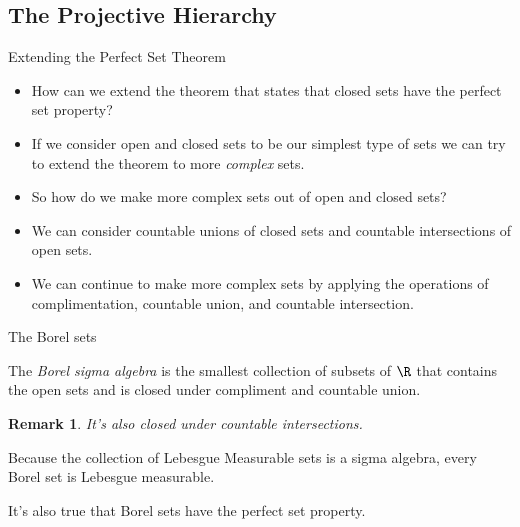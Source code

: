 \documentclass{beamer}
\newtheorem{remark}[theorem]{Remark}
\begin{document}
\subsection{The Projective Hierarchy}

\begin{frame}{Extending the Perfect Set Theorem}

\begin{itemize}
\item How can we extend the theorem that states that closed sets have the
perfect set property?
\item If we consider open and closed sets to be our simplest type of
sets we can try to extend the theorem to more \emph{complex} sets.
\item So how do we make more complex sets out of open and closed sets?
\item We can consider countable unions of closed sets and countable
intersections of open sets.
\item We can continue to make more complex sets by applying the operations
of complimentation, countable union, and countable intersection.
\end{itemize}

\end{frame}

\begin{frame}{The Borel sets}
\begin{definition}
The \emph{Borel sigma algebra} is the smallest collection of subsets
of $\R$ that contains the open sets and is closed under compliment
and countable union.
\end{definition}

\begin{remark}
It's also closed under countable intersections.
\end{remark}

\begin{fact}
Because the collection of Lebesgue Measurable sets is a sigma algebra,
every Borel set is Lebesgue measurable.
\end{fact}

\begin{fact}
It's also true that Borel sets have the perfect set property.
\end{fact}

\end{frame}
\end{document}
